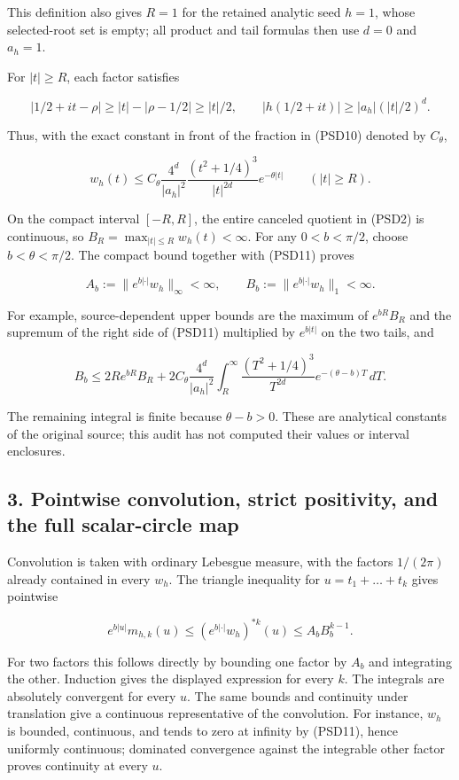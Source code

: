 \documentclass{article}
\begin{document}
This definition also gives \(R=1\) for the retained analytic seed \(h=1\), whose selected-root set is empty; all product and tail formulas then use \(d=0\) and \(a_h=1\).

For \(|t|\ge R\), each factor satisfies

\[
|1/2+it-\rho|\ge |t|-|\rho-1/2|\ge |t|/2,
\qquad |h(1/2+it)|\ge |a_h|(|t|/2)^d.
\]

Thus, with the exact constant in front of the fraction in (PSD10) denoted by \(C_\theta\),

\[
w_h(t)\le
C_\theta\frac{4^d}{|a_h|^2}
\frac{(t^2+1/4)^3}{|t|^{2d}}e^{-\theta|t|}
\qquad(|t|\ge R).
\tag{PSD11}
\]

On the compact interval \([-R,R]\), the entire canceled quotient in (PSD2) is continuous, so \(B_R=\max_{|t|\le R}w_h(t)<\infty\). For any \(0<b<\pi/2\), choose \(b<\theta<\pi/2\). The compact bound together with (PSD11) proves

\[
A_b:=\|e^{b|\cdot|}w_h\|_\infty<\infty,
\qquad B_b:=\|e^{b|\cdot|}w_h\|_1<\infty.
\tag{PSD12}
\]

For example, source-dependent upper bounds are the maximum of \(e^{bR}B_R\) and the supremum of the right side of (PSD11) multiplied by \(e^{b|t|}\) on the two tails, and

\[
B_b\le 2Re^{bR}B_R+
2C_\theta\frac{4^d}{|a_h|^2}
\int_R^\infty\frac{(T^2+1/4)^3}{T^{2d}}
e^{-(\theta-b)T}\,dT.
\tag{PSD13}
\]

The remaining integral is finite because \(\theta-b>0\). These are analytical constants of the original source; this audit has not computed their values or interval enclosures.

\subsection{3. Pointwise convolution, strict positivity, and the full scalar-circle map}\label{pointwise-convolution-strict-positivity-and-the-full-scalar-circle-map}

Convolution is taken with ordinary Lebesgue measure, with the factors \(1/(2\pi)\) already contained in every \(w_h\). The triangle inequality for \(u=t_1+\ldots+t_k\) gives pointwise

\[
e^{b|u|}m_{h,k}(u)
\le(e^{b|\cdot|}w_h)^{*k}(u)
\le A_bB_b^{k-1}.
\tag{PSD14}
\]

For two factors this follows directly by bounding one factor by \(A_b\) and integrating the other. Induction gives the displayed expression for every \(k\). The integrals are absolutely convergent for every \(u\). The same bounds and continuity under translation give a continuous representative of the convolution. For instance, \(w_h\) is bounded, continuous, and tends to zero at infinity by (PSD11), hence uniformly continuous; dominated convergence against the integrable other factor proves continuity at every \(u\).
\end{document}
